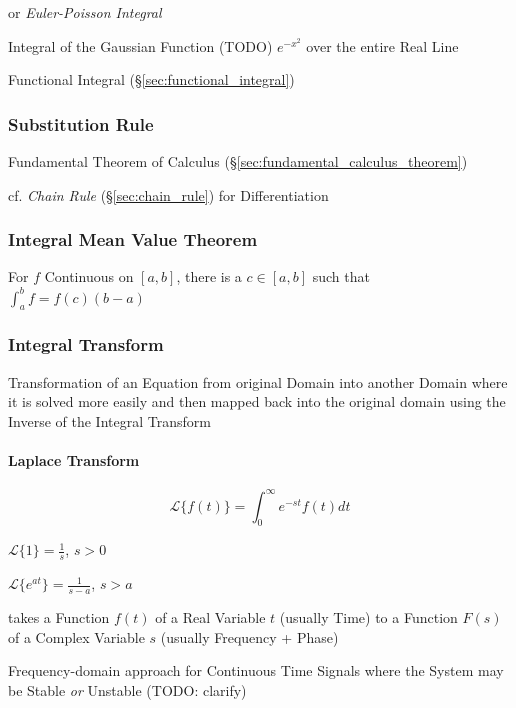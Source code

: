 or \emph{Euler-Poisson Integral}

Integral of the Gaussian Function (TODO) $e^{-x^2}$ over the entire Real Line

\fist Functional Integral (\S\ref{sec:functional_integral})



\subsubsection{Substitution Rule}\label{sec:substitution_rule}

Fundamental Theorem of Calculus (\S\ref{sec:fundamental_calculus_theorem})

\fist cf. \emph{Chain Rule} (\S\ref{sec:chain_rule}) for Differentiation



\subsubsection{Integral Mean Value Theorem}
\label{sec:integral_mean_value}

For $f$ Continuous on $[a,b]$, there is a $c \in [a,b]$ such that
$\int_a^b f = f(c)(b - a)$



\subsubsection{Integral Transform}\label{sec:integral_transform}

Transformation of an Equation from original Domain into another Domain where it
is solved more easily and then mapped back into the original domain using the
Inverse of the Integral Transform



\paragraph{Laplace Transform}\label{sec:laplace_transform}\hfill

\[
  \mathcal{L} \{ f(t) \} = \int_0^\infty e^{-st} f(t) dt
\]

$\mathcal{L}\{1\} = \frac{1}{s}$, $s > 0$

$\mathcal{L}\{e^{at}\} = \frac{1}{s-a}$, $s > a$

takes a Function $f(t)$ of a Real Variable $t$ (usually Time) to a Function
$F(s)$ of a Complex Variable $s$ (usually Frequency + Phase)

Frequency-domain approach for Continuous Time Signals where the System may be
Stable \emph{or} Unstable (TODO: clarify)

